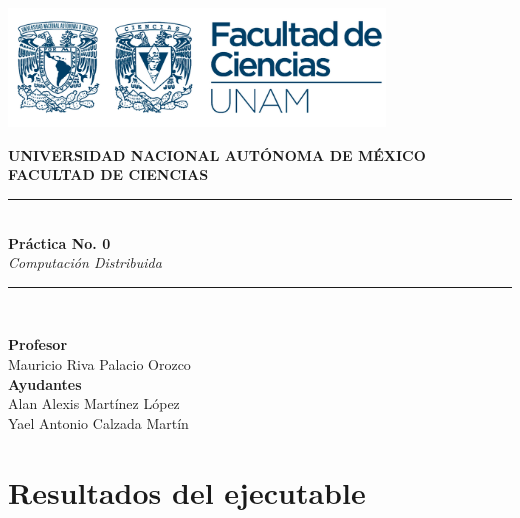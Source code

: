\documentclass[12pt]{article}
\begin{document}
\begin{titlepage}
    \begin{center}
        \includegraphics[width=10cm]{FCiencias logo.png}
        
        \vspace{2cm}
        
        {\Large \textbf{UNIVERSIDAD NACIONAL AUTÓNOMA DE MÉXICO}}\\[0.5cm]
        {\large \textbf{FACULTAD DE CIENCIAS}}\\[2cm]
        
        \rule{0.8\linewidth}{0.6pt}\\[1cm]
        
        {\Huge \textbf{Práctica No. 0}}\\[1cm]
        {\Large \textit{Computación Distribuida}}\\
        
        \rule{0.8\linewidth}{0.6pt}\\[2cm]
        
        \vspace{1cm}
        
        {\large \textbf{Profesor}}\\[0.5cm]
        Mauricio Riva Palacio Orozco\\[1cm]
        
        {\large \textbf{Ayudantes}}\\[0.5cm]
        Alan Alexis Martínez López\\
        Yael Antonio Calzada Martín\\
        
        \vfill
        
    \end{center}
\end{titlepage}

\section*{Resultados del ejecutable}
\end{document}
